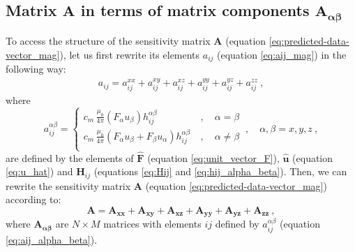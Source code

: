 \documentclass[manuscript]{geophysics}
\begin{document}
	
	\subsection{Matrix $\mathbf{A}$ in terms of matrix components $\mathbf{A_{\boldsymbol{\alpha\beta}}}$}
	
	To access the structure of the sensitivity matrix $\mathbf{A}$ 
	(equation \ref{eq:predicted-data-vector_mag}), let us first rewrite its elements 
	$a_{ij}$ (equation \ref{eq:aij_mag}) in the following way:
	\begin{equation}
		\begin{split}
			a_{ij} = a^{xx}_{ij} + a^{xy}_{ij} + a^{xz}_{ij} + a^{yy}_{ij} + a^{yz}_{ij} + a^{zz}_{ij} \: ,
		\end{split}
		\label{eq:aij_mag_expand}
	\end{equation}
	where
	\begin{equation}
		a^{\alpha\beta}_{ij} = 
		\begin{cases}
			c_{m} \, \frac{\mu_{0}}{4\pi} 
			\left( F_{\alpha} u_{\beta} \right) h^{\alpha\beta}_{ij} \: &, \quad \alpha = \beta \\
			c_{m} \, \frac{\mu_{0}}{4\pi} 
			\left( F_{\alpha} u_{\beta} + F_{\beta} u_{\alpha} \right) h^{\alpha\beta}_{ij} \: &, \quad \alpha \ne \beta \\
		\end{cases}
		\: , \quad \alpha, \beta = x, y, z \: ,
		\label{eq:aij_alpha_beta}
	\end{equation}
	are defined by the elements of $\hat{\mathbf{F}}$ 
	(equation \ref{eq:unit_vector_F}), $\hat{\mathbf{u}}$ (equation \ref{eq:u_hat}) and 
	$\mathbf{H}_{ij}$ (equations \ref{eq:Hij} and \ref{eq:hij_alpha_beta}).
	Then, we can rewrite the sensitivity matrix $\mathbf{A}$ 
	(equation \ref{eq:predicted-data-vector_mag}) according to:
	\begin{equation}
		\mathbf{A} = \mathbf{A_{xx}} + \mathbf{A_{xy}} + \mathbf{A_{xz}} + 
		\mathbf{A_{yy}} + \mathbf{A_{yz}} + \mathbf{A_{zz}} \: ,
		\label{eq:A_expand}
	\end{equation}
	where $\mathbf{A_{\boldsymbol{\alpha\beta}}}$ are $N \times M$ matrices with elements 
	$ij$ defined by $a^{\alpha\beta}_{ij}$ (equation \ref{eq:aij_alpha_beta}).
	
\end{document}

